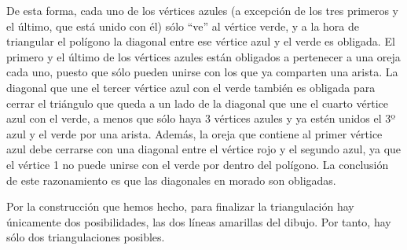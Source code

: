 \documentclass{amsart}
\begin{document}
\begin{figure}[H]
	\centering
\end{figure}

De esta forma, cada uno de los vértices azules (a excepción de los tres primeros y el último, que está unido con él) sólo ``ve'' al vértice verde, y a la hora de triangular el polígono la diagonal entre ese vértice azul y el verde es obligada. El primero y el último de los vértices azules están obligados a pertenecer a una oreja cada uno, puesto que sólo pueden unirse con los que ya comparten una arista. La diagonal que une el tercer vértice azul con el verde también es obligada para cerrar el triángulo que queda a un lado de la diagonal que une el cuarto vértice azul con el verde, a menos que sólo haya 3 vértices azules y ya estén unidos el 3º azul y el verde por una arista. Además, la oreja que contiene al primer vértice azul debe cerrarse con una diagonal entre el vértice rojo y el segundo azul, ya que el vértice 1 no puede unirse con el verde por dentro del polígono.  La conclusión de este razonamiento es que las diagonales en morado son obligadas.

Por la construcción que hemos hecho, para finalizar la triangulación hay únicamente dos posibilidades, las dos líneas amarillas del dibujo. Por tanto, hay sólo dos triangulaciones posibles.
\end{document}
